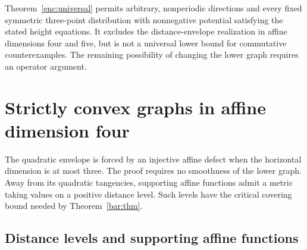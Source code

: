 \documentclass[11pt,letterpaper]{amsart}
\theoremstyle{definition}
\theoremstyle{remark}
\numberwithin{equation}{section}
\begin{document}
Theorem~\ref{enc:universal} permits arbitrary, nonperiodic directions
and every fixed symmetric three-point distribution with nonnegative
potential satisfying the stated height equations. It excludes the distance-envelope realization
in affine dimensions four and five, but is not a universal lower
bound for commutative counterexamples. The remaining possibility
of changing the lower graph requires an operator argument.

\section{Strictly convex graphs in affine dimension four}
\label{prox:sec}

The quadratic envelope is forced by an injective affine defect
when the horizontal dimension is at most three. The proof requires
no smoothness of the lower graph. Away from its quadratic
tangencies, supporting affine functions admit a metric taking
values on a positive distance level. Such levels have the critical
covering bound needed by Theorem~\ref{bar:thm}.

\subsection{Distance levels and supporting affine functions}
\end{document}
